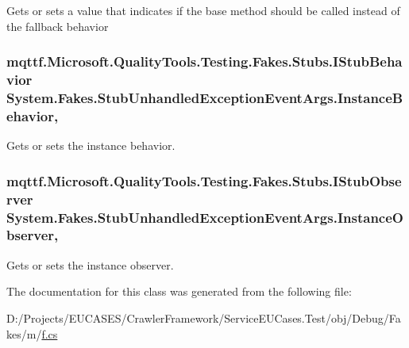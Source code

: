 Gets or sets a value that indicates if the base method should be called instead of the fallback behavior

\hypertarget{class_system_1_1_fakes_1_1_stub_unhandled_exception_event_args_a953c9c77e896745ae0e5685453afdca4}{
\subsubsection[{Instance\-Behavior}]{\setlength{\rightskip}{0pt plus 5cm}mqttf.\-Microsoft.\-Quality\-Tools.\-Testing.\-Fakes.\-Stubs.\-I\-Stub\-Behavior System.\-Fakes.\-Stub\-Unhandled\-Exception\-Event\-Args.\-Instance\-Behavior\hspace{0.3cm}{\ttfamily [get]}, {\ttfamily [set]}}}\label{class_system_1_1_fakes_1_1_stub_unhandled_exception_event_args_a953c9c77e896745ae0e5685453afdca4}


Gets or sets the instance behavior.

\hypertarget{class_system_1_1_fakes_1_1_stub_unhandled_exception_event_args_aaa08d5a76a9caa4cab8b91f1bf55cc1d}{
\subsubsection[{Instance\-Observer}]{\setlength{\rightskip}{0pt plus 5cm}mqttf.\-Microsoft.\-Quality\-Tools.\-Testing.\-Fakes.\-Stubs.\-I\-Stub\-Observer System.\-Fakes.\-Stub\-Unhandled\-Exception\-Event\-Args.\-Instance\-Observer\hspace{0.3cm}{\ttfamily [get]}, {\ttfamily [set]}}}\label{class_system_1_1_fakes_1_1_stub_unhandled_exception_event_args_aaa08d5a76a9caa4cab8b91f1bf55cc1d}


Gets or sets the instance observer.



The documentation for this class was generated from the following file\-:\begin{DoxyCompactItemize}
\item 
D\-:/\-Projects/\-E\-U\-C\-A\-S\-E\-S/\-Crawler\-Framework/\-Service\-E\-U\-Cases.\-Test/obj/\-Debug/\-Fakes/m/\hyperlink{m_2f_8cs}{f.\-cs}\end{DoxyCompactItemize}
